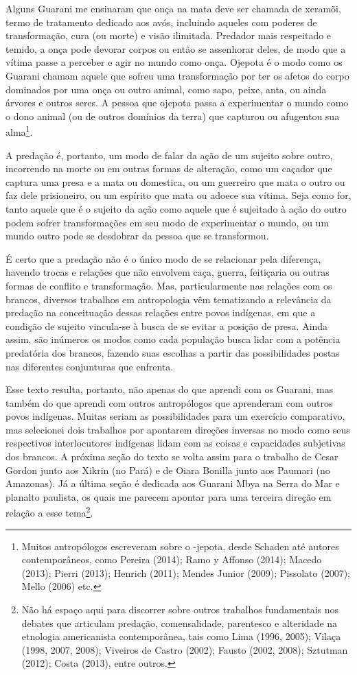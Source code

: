 Alguns Guarani me ensinaram que onça na mata deve ser chamada de
xeramõi, termo de tratamento dedicado aos avós, incluindo aqueles com
poderes de transformação, cura (ou morte) e visão ilimitada. Predador
mais respeitado e temido, a onça pode devorar corpos ou então se
assenhorar deles, de modo que a vítima passe a perceber e agir no mundo
como onça. Ojepota é o modo como os Guarani chamam aquele que sofreu
uma transformação por ter os afetos do corpo dominados por uma onça ou
outro animal, como sapo, peixe, anta, ou ainda árvores e outros seres.
A pessoa que ojepota passa a experimentar o mundo como o dono animal
(ou de outros domínios da terra) que capturou ou afugentou sua
alma\footnote{Muitos antropólogos escreveram sobre o -jepota, desde
Schaden até autores contemporâneos, como Pereira (2014); Ramo y Affonso
(2014); Macedo (2013); Pierri (2013); Henrich (2011); Mendes Junior
(2009); Pissolato (2007); Mello (2006) etc.}.

A predação é, portanto, um modo de falar da ação de um sujeito sobre
outro, incorrendo na morte ou em outras formas de alteração, como um
caçador que captura uma presa e a mata ou domestica, ou um guerreiro
que mata o outro ou faz dele prisioneiro, ou um espírito que mata ou
adoece sua vítima. Seja como for, tanto aquele que é o sujeito da ação
como aquele que é sujeitado à ação do outro podem sofrer transformações
em seu modo de experimentar o mundo, ou um mundo outro pode se
desdobrar da pessoa que se transformou.

É certo que a predação não é o único modo de se relacionar pela
diferença, havendo trocas e relações que não envolvem caça, guerra,
feitiçaria ou outras formas de conflito e transformação. Mas,
particularmente nas relações com os brancos, diversos trabalhos em
antropologia vêm tematizando a relevância da predação na conceituação
dessas relações entre povos indígenas, em que a condição de sujeito
vincula-se à busca de se evitar a posição de presa. Ainda assim, são
inúmeros os modos como cada população busca lidar com a potência
predatória dos brancos, fazendo suas escolhas a partir das
possibilidades postas nas diferentes conjunturas que enfrenta.

Esse texto resulta, portanto, não apenas do que aprendi com os Guarani,
mas também do que aprendi com outros antropólogos que aprenderam com
outros povos indígenas. Muitas seriam as possibilidades para um
exercício comparativo, mas selecionei dois trabalhos por apontarem
direções inversas no modo como seus respectivos interlocutores
indígenas lidam com as coisas e capacidades subjetivas dos brancos. A
próxima seção do texto se volta assim para o trabalho de Cesar Gordon
junto aos Xikrin (no Pará) e de Oiara Bonilla junto aos Paumari (no
Amazonas). Já a última seção é dedicada aos Guarani Mbya na Serra do
Mar e planalto paulista, os quais me parecem apontar para uma terceira
direção em relação a esse tema\footnote{Não há espaço aqui para
discorrer sobre outros trabalhos fundamentais nos debates que articulam
predação, comensalidade, parentesco e alteridade na etnologia
americanista contemporânea, tais como Lima (1996, 2005); Vilaça (1998,
2007, 2008); Viveiros de Castro (2002); Fausto (2002, 2008); Sztutman
(2012); Costa (2013), entre outros.}. 

